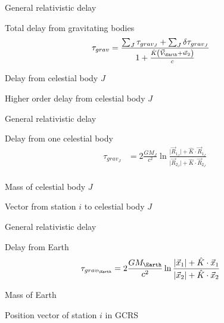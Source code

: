 \documentclass[14pt,table,t, c]{beamer}
\begin{document}
\begin{frame}{General relativistic delay}
\begin{block}{Total delay from gravitating bodies}
\vspace*{-\baselineskip}\setlength\belowdisplayskip{0pt}\setlength\abovedisplayskip{0pt}
\begin{align*}
\tau_{grav} &= \frac{\sum_J\tau_{grav_J} + \sum_J\delta\tau_{grav_J}}
{1 + \frac{\hat{K}\left(\vec{V}_{\Earth} + \vec{w}_2\right)}{c}} %
\end{align*}
\end{block}
\begin{description}
\item[$\tau_{grav_J}$] Delay from celestial body $J$
\item[$\delta\tau_{grav_J}$] Higher order delay from celestial body $J$
\end{description}
\end{frame}

\begin{frame}{General relativistic delay}
\begin{block}{Delay from one celestial body}
\vspace*{-\baselineskip}\setlength\belowdisplayskip{0pt}\setlength\abovedisplayskip{0pt}
\begin{align*}
\tau_{grav_J} &= 2\frac{GM_J}{c^2}\ln\frac{\lvert\vec{R}_{1_J}\rvert +
\hat{K}\cdot\vec{R}_{1_J}}{\lvert\vec{R}_{2_J}\rvert + \hat{K}\cdot\vec{R}_{2_J}} \\
\end{align*}
\end{block}
\begin{description}[$\vec{R}_{i_J}$]
\item[$M_J$] Mass of celestial body $J$
\item[$\vec{R}_{i_J}$] Vector from station $i$ to celestial body $J$
\end{description}
\end{frame}


\begin{frame}{General relativistic delay}
\begin{block}{Delay from Earth}
\vspace*{-\baselineskip}\setlength\belowdisplayskip{0pt}\setlength\abovedisplayskip{0pt}
\begin{align*}
\tau_{grav_{\Earth}} &= 2\frac{GM_{\Earth}}{c^2}\ln\frac{\lvert\vec{x}_1\rvert +
\hat{K}\cdot\vec{x}_1}{\lvert\vec{x}_2\rvert + \hat{K}\cdot\vec{x}_2}
\end{align*}
\end{block}
\begin{description}[$M_\Earth$]
\item[$M_\Earth$] Mass of Earth
\item[$\vec{x}_i$] Position vector of station $i$ in GCRS
\end{description}
\end{frame}
\end{document}
